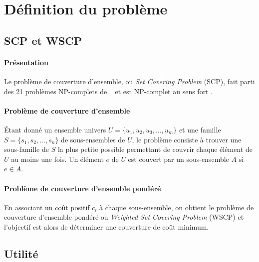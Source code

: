 \documentclass[12pt,letterpaper,twoside]{article}
\begin{document}
	\maketitle{}
	{\footnotesize
	\tableofcontents{}}
	\newpage{}
	\section{Définition du problème}
		\subsection{SCP et WSCP}
			\paragraph*{Présentation\\}
				Le problème de couverture d'ensemble, ou \emph{Set Covering Problem} (SCP),
				fait parti des 21 problèmes NP-complets de \citeauthor{Karp1972}~\cite{Karp1972}
				et est NP-complet au sens fort \cite{garey2002computers}.
			\paragraph*{Problème de couverture d'ensemble\\}
				Étant donné un ensemble univers \(U = \{u_1, u_2, u_3, \dots, u_m\}\) et une famille \(S = \{s_1, s_2, \dots, s_n\}\) de sous-ensembles de \(U\),
				le problème consiste à trouver une sous-famille de \(S\) la plus petite possible permettant de couvrir chaque élément de \(U\)
				au moins une fois. Un élément \(e\) de \(U\) est couvert par un sous-ensemble \(A\) si \(e \in A\).
			\paragraph*{Problème de couverture d'ensemble pondéré\\}
				En associant un coût positif \(c_i\) à chaque sous-ensemble, on obtient le problème de couverture d'ensemble pondéré ou \emph{Weighted Set Covering Problem} (WSCP) et	l'objectif est alors de déterminer une couverture de coût minimum.~\cite{Vazirani2003}
		\subsection{Utilité}
\end{document}
